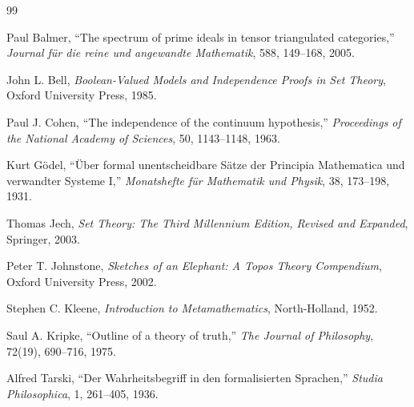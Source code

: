 \documentclass[11pt]{ltjsarticle}
\theoremstyle{plain}
\theoremstyle{definition}
\begin{document}
\begin{thebibliography}{99}

Paul Balmer,
``The spectrum of prime ideals in tensor triangulated categories,''
\emph{Journal für die reine und angewandte Mathematik}, 588, 149--168, 2005.

John L. Bell,
\emph{Boolean-Valued Models and Independence Proofs in Set Theory},
Oxford University Press, 1985.

Paul J. Cohen,
``The independence of the continuum hypothesis,''
\emph{Proceedings of the National Academy of Sciences}, 50, 1143--1148, 1963.

Kurt Gödel,
``Über formal unentscheidbare Sätze der Principia Mathematica und verwandter Systeme I,''
\emph{Monatshefte für Mathematik und Physik}, 38, 173--198, 1931.

Thomas Jech,
\emph{Set Theory: The Third Millennium Edition, Revised and Expanded},
Springer, 2003.

Peter T. Johnstone,
\emph{Sketches of an Elephant: A Topos Theory Compendium},
Oxford University Press, 2002.

Stephen C. Kleene,
\emph{Introduction to Metamathematics},
North-Holland, 1952.

Saul A. Kripke,
``Outline of a theory of truth,''
\emph{The Journal of Philosophy}, 72(19), 690--716, 1975.

Alfred Tarski,
``Der Wahrheitsbegriff in den formalisierten Sprachen,''
\emph{Studia Philosophica}, 1, 261--405, 1936.

\end{thebibliography}
\end{document}
